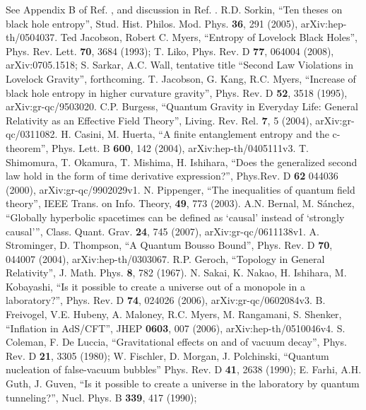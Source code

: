 \documentclass[12pt]{article}
\begin{document}
\begin{thebibliography}{99}
See Appendix B of Ref. \cite{FPST}, and discussion in Ref. \cite{10proofs}.
R.D. Sorkin, ``Ten theses on black hole entropy'', Stud. Hist. Philos. Mod. Phys. \textbf{36}, 291 (2005), arXiv:hep-th/0504037.
Ted Jacobson, Robert C. Myers, ``Entropy of Lovelock Black Holes'', Phys. Rev. Lett. \textbf{70}, 3684 (1993); T. Liko, Phys. Rev. D \textbf{77}, 064004 (2008), arXiv:0705.1518;
S. Sarkar, A.C. Wall, tentative title ``Second Law Violations in Lovelock Gravity'', forthcoming.
T. Jacobson, G. Kang, R.C. Myers, ``Increase of black hole entropy in higher curvature gravity'', Phys. Rev. D \textbf{52}, 3518 (1995), arXiv:gr-qc/9503020.
C.P. Burgess, ``Quantum Gravity in Everyday Life: General Relativity as an Effective Field Theory'', Living. Rev. Rel. \textbf{7}, 5 (2004), arXiv:gr-qc/0311082.
H. Casini, M. Huerta, ``A finite entanglement entropy and the c-theorem'', Phys. Lett. B \textbf{600}, 142 (2004), arXiv:hep-th/0405111v3.
T. Shimomura, T. Okamura, T. Mishima, H. Ishihara, ``Does the generalized second law hold in the form of time derivative expression?'', Phys.Rev. D \textbf{62} 044036 (2000), arXiv:gr-qc/9902029v1.
N. Pippenger, ``The inequalities of quantum field theory'', IEEE Trans. on Info. Theory, \textbf{49}, 773 (2003).
A.N. Bernal, M. S\'{a}nchez, ``Globally hyperbolic spacetimes can be defined as `causal' instead of `strongly causal'\phantom{.}'',
Class. Quant. Grav. \textbf{24}, 745 (2007), arXiv:gr-qc/0611138v1.
A. Strominger, D. Thompson, ``A Quantum Bousso Bound'', Phys. Rev. D \textbf{70}, 044007 (2004), arXiv:hep-th/0303067.
R.P. Geroch, ``Topology in General Relativity'', J. Math. Phys. \textbf{8}, 782 (1967).
N. Sakai, K. Nakao, H. Ishihara, M. Kobayashi, ``Is it possible to create a universe out of a monopole in a laboratory?'', Phys. Rev. D \textbf{74}, 024026 (2006), arXiv:gr-qc/0602084v3.
B. Freivogel, V.E. Hubeny, A. Maloney, R.C. Myers, M. Rangamani, S. Shenker, ``Inflation in AdS/CFT'', JHEP \textbf{0603}, 007 (2006),
arXiv:hep-th/0510046v4.
S. Coleman, F. De Luccia, ``Gravitational effects on and of vacuum decay'', Phys. Rev. D \textbf{21}, 3305 (1980);
W. Fischler, D. Morgan, J. Polchinski, ``Quantum nucleation of false-vacuum bubbles'' Phys. Rev. D \textbf{41}, 2638 (1990);
E. Farhi, A.H. Guth, J. Guven, ``Is it possible to create a universe in the laboratory by quantum tunneling?'', 
Nucl. Phys. B \textbf{339}, 417 (1990);

\end{thebibliography}
\end{document}

